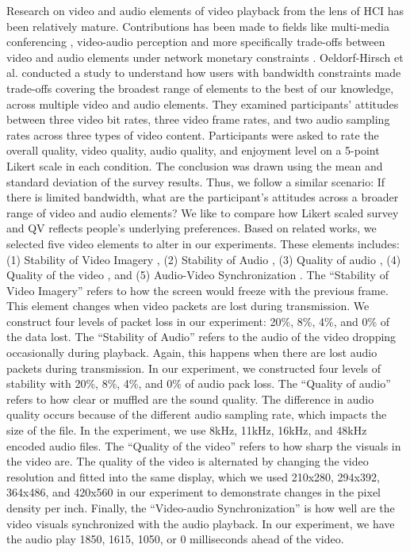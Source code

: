 Research on video and audio elements of video playback from the lens of HCI has been relatively mature.
Contributions has been made to fields like multi-media conferencing \cite{watson1996evaluating}, video-audio perception \cite{chen2006cognitive, molnar2015assessing}and more specifically trade-offs between video and audio elements under network monetary constraints \cite{molnar2013comedy, oeldorf2012bad}.
Oeldorf-Hirsch et al. \cite{oeldorf2012bad} conducted a study to understand how users with bandwidth constraints made trade-offs covering the broadest range of elements to the best of our knowledge, across multiple video and audio elements. 
They examined participants' attitudes between three video bit rates, three video frame rates, and two audio sampling rates across three types of video content.
Participants were asked to rate the overall quality, video quality, audio quality, and enjoyment level on a 5-point Likert scale in each condition. 
The conclusion was drawn using the mean and standard deviation of the survey results.
Thus, we follow a similar scenario: 
If there is limited bandwidth, what are the participant's attitudes across a broader range of video and audio elements?
We like to compare how Likert scaled survey and QV reflects people's underlying preferences. 
Based on related works, we selected five video elements to alter in our experiments. 
These elements includes: (1) Stability of Video Imagery \cite{claypool1999effects}, (2) Stability of Audio \cite{claypool1999effects}, (3) Quality of audio \cite{oeldorf2012bad, noll1993wideband}, (4) Quality of the video \cite{oeldorf2012bad, knoche2008low}, and (5) Audio-Video Synchronization \cite{steinmetz1996human}. 
The ``Stability of Video Imagery'' refers to how the screen would freeze with the previous frame. 
This element changes when video packets are lost during transmission. 
We construct four levels of packet loss in our experiment: 20\%, 8\%, 4\%, and 0\% of the data lost. 
The ``Stability of Audio'' refers to the audio of the video dropping occasionally during playback. 
Again, this happens when there are lost audio packets during transmission. 
In our experiment, we constructed four levels of stability with 20\%, 8\%, 4\%, and 0\% of audio pack loss. 
The ``Quality of audio'' refers to how clear or muffled are the sound quality. 
The difference in audio quality occurs because of the different audio sampling rate, which impacts the size of the file. 
In the experiment, we use 8kHz, 11kHz, 16kHz, and 48kHz encoded audio files. 
The ``Quality of the video'' refers to how sharp the visuals in the video are.
The quality of the video is alternated by changing the video resolution and fitted into the same display, which we used 210x280, 294x392, 364x486, and 420x560 in our experiment to demonstrate changes in the pixel density per inch.
Finally, the ``Video-audio Synchronization'' is how well are the video visuals synchronized with the audio playback.
In our experiment, we have the audio play 1850, 1615, 1050, or 0 milliseconds ahead of the video.

